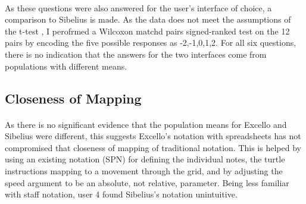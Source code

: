 \label{evaluation:cdnQuestions}

\paragraph{} As these questions were also answered for the user's interface of choice, a comparison to Sibelius is made. As the data does not meet the assumptions of the t-test \cite{barry:likert}, I perofrmed a Wilcoxon matchd pairs signed-ranked test on the 12 pairs by encoding the five possible responses as -2,-1,0,1,2. For all six questions, there is no indication that the answers for the two interfaces come from populations with different means.

\subsection{Closeness of Mapping}

\paragraph{} As there is no significant evidence that the population means for Excello and Sibelius were different, this suggests Excello's notation with spreadsheets has not compromised that closeness of mapping of traditional notation. This is helped by using an existing notation (SPN) for defining the individual notes, the turtle instructions mapping to a movement through the grid, and by adjusting the speed argument to be an absolute, not relative, parameter. Being less familiar with staff notation, user 4 found Sibelius's notation unintuitive.

